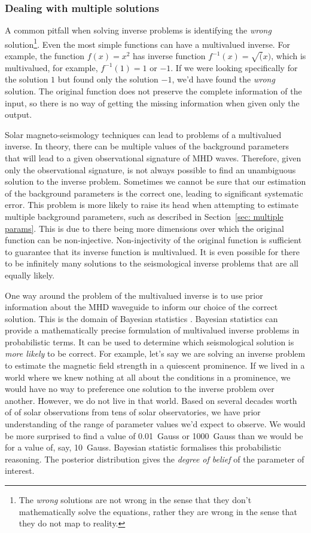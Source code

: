 \documentclass[12pt]{../style-files/ociamthesis}
\begin{document}
\subsubsection{Dealing with multiple solutions} \label{sec: multiple roots}

A common pitfall when solving inverse problems is identifying the \textit{wrong} solution\footnote{The \textit{wrong} solutions are not wrong in the sense that they don't mathematically solve the equations, rather they are wrong in the sense that they do not map to reality.}. Even the most simple functions can have a multivalued inverse. For example, the function $f(x) = x^2$ has inverse function $f^{-1}(x) = \sqrt(x)$, which is multivalued, for example, $f^{-1}(1) = 1$ or $-1$. If we were looking specifically for the solution $1$ but found only the solution $-1$, we'd have found the \textit{wrong} solution. The original function does not preserve the complete information of the input, so there is no way of getting the missing information when given only the output.

Solar magneto-seismology techniques can lead to problems of a multivalued inverse. In theory, there can be multiple values of the background parameters that will lead to a given observational signature of MHD waves. Therefore, given only the observational signature, is not always possible to find an unambiguous solution to the inverse problem. Sometimes we cannot be sure that our estimation of the background parameters is the correct one, leading to significant systematic error. This problem is more likely to raise its head when attempting to estimate multiple background parameters, such as described in Section~\ref{sec: multiple params}. This is due to there being more dimensions over which the original function can be non-injective. Non-injectivity of the original function is sufficient to guarantee that its inverse function is multivalued. It is even possible for there to be infinitely many solutions to the seismological inverse problems that are all equally likely.

One way around the problem of the multivalued inverse is to use prior information about the MHD waveguide to inform our choice of the correct solution. This is the domain of Bayesian statistics \citep{arr_etal11,arr_etal18}. Bayesian statistics can provide a mathematically precise formulation of multivalued inverse problems in probabilistic terms. It can be used to determine which seismological solution is \textit{more likely} to be correct. For example, let's say we are solving an inverse problem to estimate the magnetic field strength in a quiescent prominence. If we lived in a world where we knew nothing at all about the conditions in a prominence, we would have no way to preference one solution to the inverse problem over another. However, we do not live in that world. Based on several decades worth of of solar observations from tens of solar observatories, we have prior understanding of the range of parameter values we'd expect to observe. We would be more surprised to find a value of 0.01~Gauss or 1000~Gauss than we would be for a value of, say, 10~Gauss. Bayesian statistic formalises this probabilistic reasoning. The posterior distribution gives the \textit{degree of belief} of the parameter of interest.
\end{document}
